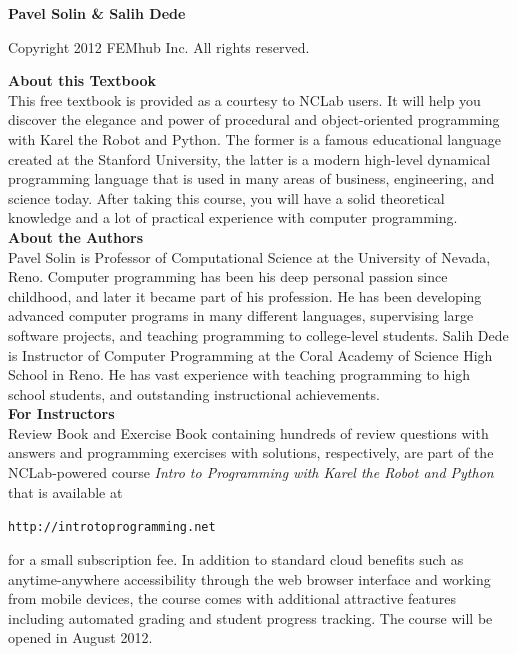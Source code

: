 \documentclass[article,A4,12pt]{llncs}
\newif\iffullversion
\begin{document}
\begin{center}
\iffullversion
\else
\centerline{\huge \color{red}{PREVIEW}}
\fi
\vfill
{\large
{\bf Pavel Solin \& Salih Dede}
}
\end{center}
\vfill
\vfill
\begin{center}
Copyright 2012 FEMhub Inc. All rights reserved.
\end{center}
\newpage
\vbox{}
\vfill
{
\noindent
{\bf About this Textbook}\\[4mm]
This free textbook is provided as a courtesy to NCLab users. 
It will help you discover the elegance and power of procedural and 
object-oriented programming with Karel the Robot and Python. The former 
is a famous educational language created at the Stanford University, the 
latter is a modern high-level dynamical programming language that is used
in many areas of business, engineering, and science today. After taking 
this course, you will have a solid theoretical knowledge and a lot of 
practical experience with computer programming. \\[12mm]

\noindent
{\bf About the Authors}\\[4mm]
Pavel Solin is Professor of Computational Science at the University of Nevada, Reno. 
Computer programming has been his deep personal passion since childhood, and later it 
became part of his profession. He has been developing advanced computer programs in many
different languages, supervising large software projects, and teaching programming to 
college-level students. Salih Dede is Instructor of Computer
Programming at the Coral Academy of Science High School in Reno. He has vast experience 
with teaching programming to high school students, and outstanding instructional
achievements. \\[12mm]


\noindent
{\bf For Instructors}\\[4mm]
Review Book and Exercise Book containing 
hundreds of review questions with answers and programming exercises with
solutions, respectively, are part of the NCLab-powered course 
{\em Intro to Programming with Karel the Robot and Python} that is 
available at \\

\centerline{\tt http://introtoprogramming.net}
\vspace{5mm}

\noindent
for a small subscription fee.  In addition to 
standard cloud benefits such as anytime-anywhere accessibility through 
the web browser interface and working from mobile devices, the course comes with 
additional attractive features including 
automated grading and student progress tracking. 
The course will be opened in August 2012.
}
\vfill
\end{document}

